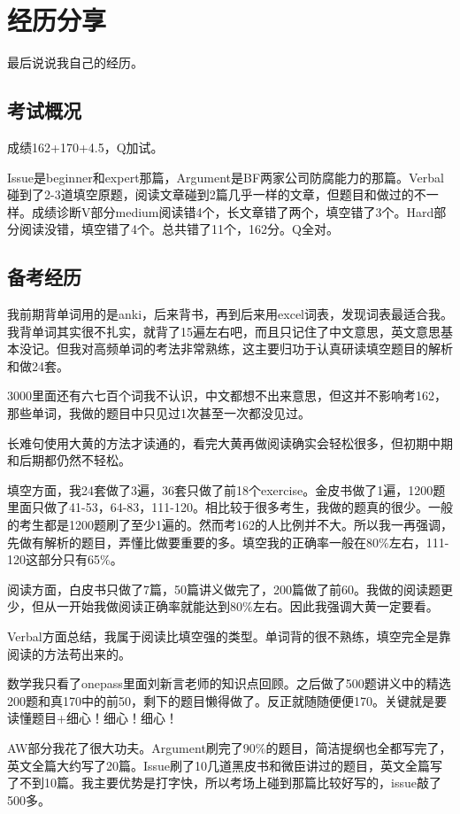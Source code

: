 \documentclass[cn,plain]{elegantbookex}
\begin{document}
\chapter{经历分享}
最后说说我自己的经历。

\section{考试概况}
成绩162+170+4.5，Q加试。

Issue是beginner和expert那篇，Argument是BF两家公司防腐能力的那篇。Verbal碰到了2-3道填空原题，阅读文章碰到2篇几乎一样的文章，但题目和做过的不一样。成绩诊断V部分medium阅读错4个，长文章错了两个，填空错了3个。Hard部分阅读没错，填空错了4个。总共错了11个，162分。Q全对。

\section{备考经历}
我前期背单词用的是anki，后来背书，再到后来用excel词表，发现词表最适合我。我背单词其实很不扎实，就背了15遍左右吧，而且只记住了中文意思，英文意思基本没记。但我对高频单词的考法非常熟练，这主要归功于认真研读填空题目的解析和做24套。

3000里面还有六七百个词我不认识，中文都想不出来意思，但这并不影响考162，那些单词，我做的题目中只见过1次甚至一次都没见过。

长难句使用大黄的方法才读通的，看完大黄再做阅读确实会轻松很多，但初期中期和后期都仍然不轻松。

填空方面，我24套做了3遍，36套只做了前18个exercise。金皮书做了1遍，1200题里面只做了41-53，64-83，111-120。相比较于很多考生，我做的题真的很少。一般的考生都是1200题刷了至少1遍的。然而考162的人比例并不大。所以我一再强调，先做有解析的题目，弄懂比做要重要的多。填空我的正确率一般在80\%左右，111-120这部分只有65\%。

阅读方面，白皮书只做了7篇，50篇讲义做完了，200篇做了前60。我做的阅读题更少，但从一开始我做阅读正确率就能达到80\%左右。因此我强调大黄一定要看。

Verbal方面总结，我属于阅读比填空强的类型。单词背的很不熟练，填空完全是靠阅读的方法苟出来的。

数学我只看了onepass里面刘新言老师的知识点回顾。之后做了500题讲义中的精选200题和真170中的前50，剩下的题目懒得做了。反正就随随便便170。关键就是要读懂题目+细心！细心！细心！

AW部分我花了很大功夫。Argument刷完了90\%的题目，简洁提纲也全都写完了，英文全篇大约写了20篇。Issue刷了10几道黑皮书和微臣讲过的题目，英文全篇写了不到10篇。我主要优势是打字快，所以考场上碰到那篇比较好写的，issue敲了500多。
\end{document}
